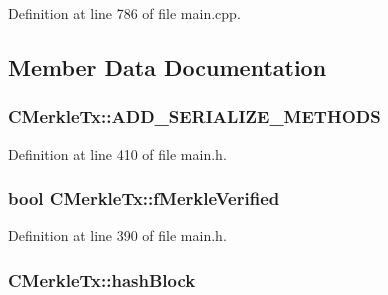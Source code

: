 Definition at line 786 of file main.\+cpp.



\subsection{Member Data Documentation}
\hypertarget{class_c_merkle_tx_a86d607a3e47700ed5ebcdd4d4fcda4d7}{}
\subsubsection[{A\+D\+D\+\_\+\+S\+E\+R\+I\+A\+L\+I\+Z\+E\+\_\+\+M\+E\+T\+H\+O\+D\+S}]{\setlength{\rightskip}{0pt plus 5cm}C\+Merkle\+Tx\+::\+A\+D\+D\+\_\+\+S\+E\+R\+I\+A\+L\+I\+Z\+E\+\_\+\+M\+E\+T\+H\+O\+D\+S}\label{class_c_merkle_tx_a86d607a3e47700ed5ebcdd4d4fcda4d7}


Definition at line 410 of file main.\+h.

\hypertarget{class_c_merkle_tx_a3626572f7dbb86eb1c36a6570d740c7f}{}
\subsubsection[{f\+Merkle\+Verified}]{\setlength{\rightskip}{0pt plus 5cm}bool C\+Merkle\+Tx\+::f\+Merkle\+Verified\hspace{0.3cm}{\ttfamily [mutable]}}\label{class_c_merkle_tx_a3626572f7dbb86eb1c36a6570d740c7f}


Definition at line 390 of file main.\+h.

\hypertarget{class_c_merkle_tx_a788ee54c14b6d9706eb3737404663238}{}
\subsubsection[{hash\+Block}]{ C\+Merkle\+Tx\+::hash\+Block}\label{class_c_merkle_tx_a788ee54c14b6d9706eb3737404663238}


